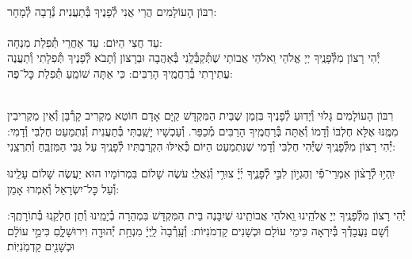 \documentclass[twoside, openany, parskip=half, 11pt]{book}
\begin{document}
\begin{sometimes}

\\
רִבּוֹן הָעוֹלָמִים הֲרֵי אֲנִי לְ֯פָנֶיךָ בְּ֯תַעֲנִית נְ֯דָבָה לְ֯מָחָר:\\
\\
עַד חֲצִי הַיּוֹם:  עַד אַחֲרֵי תְּ֯פִלַת מִנְחָה:\\
יְ֯הִי רָצוֹן מִלְּ֯פָנֶֽיךָ יְיָ אֱלֹהַי וֵאלֹהֵי אֲבוֹתַי שֶׁתְּ֯קַבְּ֯לֵֽנִי בְּ֯אַהֲבָה וּבְרָצוֹן וְ֯תָבֹא לְ֯פָנֶיךָ תְּ֯פִלָתִי
וְ֯תַעֲנֶה עֲתִירָתִי בְּ֯רַחֲמֶֽיךָ הָרַבִּים: כִּי אַתָּה שׁוֹמֵֽעַ תְּ֯פִלַת כׇּל־פֶּה: 

\sepline

\nextpage
{}\\
רִבּוֹן הָעוֹלָמִים גָּלוּי וְ֯יָדֽוּעַ לְ֯פָנֶיךָ בִּזְמַן שֶׁבֵּית הַמִּקְדָּשׁ קַיָּם אָדָם חוֹטֵא מַקְרִיב קָרְ֯בָּן וְ֯אֵין מַקְרִיבִין מִמֶּֽנּוּ אֶלָּא חֶלְבּוֹ וְ֯דָמוֹ וְ֯אַתָּה בְּ֯רַחֲמֶֽיךָ הָרַבִּים מְ֯כַפֵּר. וְ֯עַכְשָׁיו יָשַֽׁבְתִּי בְּ֯תַעֲנִית וְ֯נִתְמַעֵט חֶלְבִּי וְ֯דָמִי: יְ֯הִי רָצוֹן מִלְּ֯פָנֶֽיךָ שֶׁיְּ֯הִי חֶלְבִּי וְ֯דָמִי שֶׁנִּתְמַעַט הַיּוֹם כְּ֯אִילּוּ הִקְרַבְתִּיו לְ֯פָנֶֽיךָ עַל גַּבֵּי הַמִּזְבֵּֽחַ וְ֯תִרְצֵֽנִי:


\end{sometimes}

יִֽהְי֥וּ לְ֯רָצ֨וֹן אִמְרֵי־פִ֡י וְהֶגְי֣וֹן לִבִּ֣י לְ֯פָנֶ֑יךָ יְ֜יָ֗ צוּרִ֥י וְ֯גֹֽאֲלִֽי׃ עֹשֶׂה שָׁלוֹם בִּמְרוֹמָיו הוּא יַעֲשֶׂה שָׁלוֹם עָלֵֽינוּ וְ֯עַל כׇּל־יִשְׂרָאֵל וְ֯אִמְרוּ אָמֵן:


\begin{small}

יְ֯הִי רָצוֹן מִלְּ֯פָנֶֽיךָ יְיָ אֱלֹהֵֽינוּ וִֵאלֹהֵי אֲבוֹתֵֽינוּ שֶׁיִבָּנֶה בֵּית הַמִּקְדָּשׁ בִּמְהֵרָה בְ֯יָמֵֽינוּ וְ֯תֵן חֶלְקֵֽנוּ בְּ֯תוֹרָתֶֽךָ: וְ֯שָׁם נַעֲבָדְ֯ךָ בְּ֯יִרְאָה כִּימֵי עוֹלָם וּכְשָׁנִים קַדְמֹנִיּוֹת:
וְ֯עָֽרְ֯בָה֙ לַֽיְיָ֔ מִנְחַ֥ת יְ֯הוּדָ֖ה וִירוּשָׁלָ֑םִ כִּימֵ֣י עוֹלָ֔ם וּכְשָׁנִ֖ים קַדְמֹֽנִיּֽוֹת׃


\end{small}



\\
\end{document}
